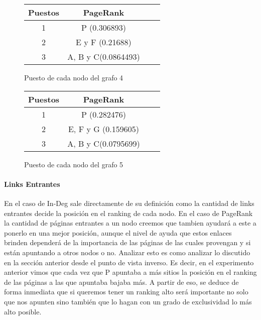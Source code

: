 \begin{figure}[H]
\centering
\begin{minipage}{0.48\textwidth}
\centering

\begin{tabular}{| c | c | c | c |}
  \hline
  Puestos & PageRank\\ \hline \hline
  1 & P (0.306893)\\ \hline
  2 & E y F (0.21688)\\ \hline
  3 & A, B y C(0.0864493)\\ \hline
\end{tabular}
  \caption{\footnotesize{Puesto de cada nodo del grafo 4}}
  \label{fig:Rankings}

\end{minipage}
\hspace{0.02\textwidth}
\begin{minipage}{0.48\textwidth}
  \centering

\begin{tabular}{| c | c | c | c |}
  \hline
  Puestos & PageRank\\ \hline \hline
  1 & P (0.282476)\\ \hline
  2 & E, F y G (0.159605)\\ \hline
  3 & A, B y C(0.0795699)\\ \hline
\end{tabular}
  \caption{\footnotesize{Puesto de cada nodo del grafo 5}}
  \label{fig:Rankings}

\end{minipage}
\end{figure}


\paragraph{Links Entrantes}

En el caso de In-Deg sale directamente de su definición como la cantidad de links entrantes decide la posición en el ranking de cada nodo. En el caso de PageRank la cantidad de páginas entrantes a un nodo creemos que tambien ayudará a este a ponerlo en una mejor posición, aunque el nivel de ayuda que estos enlaces brinden dependerá de la importancia de las páginas de las cuales provengan y si están apuntando a otros nodos o no. Analizar esto es como analizar lo discutido en la sección anterior desde el punto de vista inverso. Es decir, en el experimento anterior vimos que cada vez que P apuntaba a más sitios la posición en el ranking de las páginas a las que apuntaba bajaba más. A partir de eso, se deduce de forma inmediata que si queremos tener un ranking alto será importante no solo que nos apunten sino también que lo hagan con un grado de exclusividad lo más alto posible.


